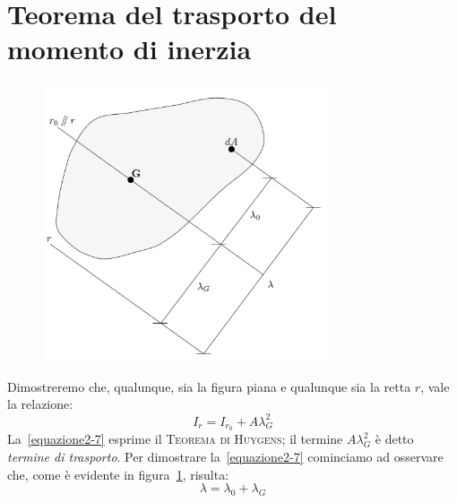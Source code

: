 \section{Teorema del trasporto del momento di inerzia}
\renewcommand{\thefigure}{2~-~6}
\begin{figure}[ht]
\centering
\includegraphics[width=0.75\textwidth]{Immagini/Parte_2/Figura2_6/Figura2_6.pdf}
\caption{}
\label{figura2-6}
\end{figure}
Dimostreremo che, qualunque, sia la figura piana e qualunque sia la retta $r$, vale la relazione:
\begin{equation} \label{equazione2-7}
\boxed{I_r = I_{r_0}+A\lambda_{G}^{2}}
\tag{2.7}
\end{equation}
La~\eqref{equazione2-7} esprime il \textsc{Teorema di Huygens}; il termine $A\lambda_{G}^{2}$ è detto \emph{termine di trasporto}. Per dimostrare la~\eqref{equazione2-7} cominciamo ad osservare che, come è evidente in figura~\ref{figura2-6}, risulta:
\begin{equation*}
\lambda = \lambda_0+\lambda_G
\end{equation*}
